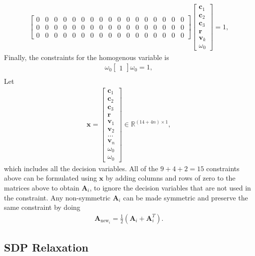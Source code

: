 \documentclass{article}
\begin{document}
\begin{align}
\begin{bmatrix}
        0 & 0 & 0 & 0 & 0 & 0 & 0 & 0 & 0 & 0 & 0 & 0 & 0 & 0 & 0 & 0 & 0 \\
        0 & 0 & 0 & 0 & 0 & 0 & 0 & 0 & 0 & 0 & 0 & 0 & 0 & 0 & 0 & 0 & 0 \\
        0 & 0 & 0 & 0 & 0 & 0 & 0 & 0 & 0 & 0 & 0 & 0 & 0 & 0 & 0 & 0 & 0
    \end{bmatrix}
    \begin{bmatrix}
        \mathbf{c}_1 \\
        \mathbf{c}_2 \\
        \mathbf{c}_3 \\
        \mathbf{r} \\
        \mathbf{v}_k \\
        \omega_0
    \end{bmatrix} = 1,
\end{align}
Finally, the constraints for the homogenous variable is 
\begin{align}
    \omega_0 \begin{bmatrix} 1 \end{bmatrix} \omega_0 = 1,\\
\end{align}
Let
\begin{align}
\mathbf{x} = \begin{bmatrix} \mathbf{c}_1 \\ \mathbf{c}_2 \\ \mathbf{c}_3 \\ \mathbf{r} \\ \mathbf{v}_1 \\ \mathbf{v}_2 \\ \dots \\ \mathbf{v}_n \\ \omega_0 \\ \omega_0 \end{bmatrix} \in \mathbb{R}^{(14 + 4n) \times 1},
\end{align}
which includes all the decision variables. 
All of the $9 + 4 + 2 = 15$ constraints above can be formulated using $\mathbf{x}$ by adding columns and rows of zero to the matrices above to obtain $\mathbf{A}_i$,
to ignore the decision variables that are not used in the constraint. Any non-symmetric $\mathbf{A}_i$ can be made symmetric and preserve the same constraint by doing
\begin{align}
    \mathbf{A}_{\text{new}_i} = \frac{1}{2}(\mathbf{A}_i + \mathbf{A}_i^T).
\end{align}

\subsection{SDP Relaxation}
\end{document}
